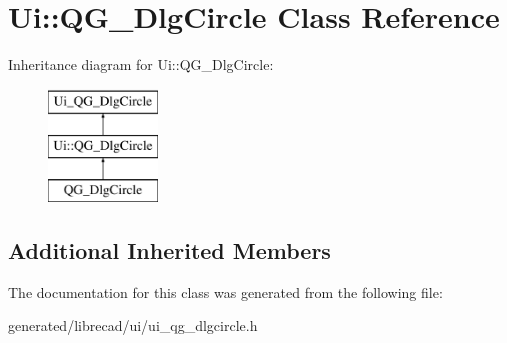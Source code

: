 \hypertarget{classUi_1_1QG__DlgCircle}{\section{Ui\-:\-:Q\-G\-\_\-\-Dlg\-Circle Class Reference}
\label{classUi_1_1QG__DlgCircle}
}
Inheritance diagram for Ui\-:\-:Q\-G\-\_\-\-Dlg\-Circle\-:\begin{figure}[H]
\begin{center}
\leavevmode
\includegraphics[height=3.000000cm]{classUi_1_1QG__DlgCircle}
\end{center}
\end{figure}
\subsection*{Additional Inherited Members}


The documentation for this class was generated from the following file\-:\begin{DoxyCompactItemize}
\item 
generated/librecad/ui/ui\-\_\-qg\-\_\-dlgcircle.\-h\end{DoxyCompactItemize}
